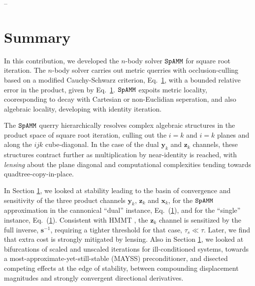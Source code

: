 \documentclass[letterpaper,twocolumn,amsmath,amsfont,amssymb,english,aps,jcp,preprintnumbers,groupaddress,nofootinbib,tightenlines,floatfix]{revtex4}
\newcommand{\mat}[1]{\boldsymbol{#1}}
\theoremstyle{plain}
\theoremstyle{remark}
\theoremstyle{plain}
\begin{document}
\pagebreak

--
\pagebreak
\section{Summary}

In this contribution, we developed the $n$-body solver $\tt SpAMM$ for square root iteration.   
The $n$-body solver carries out metric querries with occlusion-culling based on a modified Cauchy-Schwarz criterion, 
Eq.~\ref{}, with a bounded relative error in the product, given by Eq.~\ref{}. 
$\tt SpAMM$ expoits metric locality, cooresponding to decay with Cartesian or non-Euclidian seperation, 
and also algebraic locality, developing with identity iteration.  

The $\tt SpAMM$ querry hierarchically resolves complex algebraic structures in the product space of square root iteration,  
culling out the $i=k$ and $i=k$ planes and along the $ijk$ cube-diagonal.  In the case of the dual $\mat{y}_k$ and $\mat{z}_k$ channels,  
these structures contract further as multiplication by near-identity is reached, with
{\em lensing} about the plane diagonal and computational complexities tending towards quadtree-copy-in-place.
 
In Section \ref{}, we looked at stability leading to the basin of convergence and sensitivity of the three
product channels $\mat{y}_k$, $\mat{z}_k$ and $\mat{x}_k$, for the $\tt SpAMM$ approximation in the 
cannonical ``dual'' instance, Eq.~(\ref{}), and for the ``single'' instance, Eq.~(\ref{}).
Consistent with HMMT \cite{}, the $\mat{z}_k$ channel is sensitized by the full inverse,
$\mat{s}^{-1}$, requiring a tighter threshold for that case, $\tau_s \ll \tau$.  Later, we find that 
extra cost is strongly mitigated by lensing.  Also in Section \ref{}, we looked at bifurcations 
of scaled and unscaled iterations for ill-conditioned systems, towards a most-approximate-yet-still-stable (MAYSS) 
preconditioner, and disected competing effects at the edge of stability,  between compounding displacement magnitudes and 
strongly convergent directional derivatives.  
\end{document}
